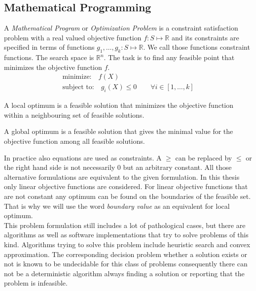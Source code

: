 \subsection{Mathematical Programming}
A \emph{Mathematical Program} or \emph{Optimization Problem} is a constraint satisfaction problem with a real valued objective function $f:S\mapsto \mathbb{R}$ and its constraints are specified in terms of functions $g_1,\dots,g_k:S\mapsto\mathbb{R}$. We call those functions constraint functions. The search space is $\mathbb{R}^n$. The task is to find any feasible point that minimizes the objective function $f$.
\begin{eqnarray}
\text{minimize:} \quad f(X)\\
\text{subject to:} \quad g_i(X)\leq 0 \qquad \forall i\in\left[1,\dots ,k\right] 
\end{eqnarray}
\begin{definition}
A local optimum is a feasible solution that minimizes the objective function within a neighbouring set of feasible solutions.
\end{definition}
\begin{definition}
A global optimum is a feasible solution that gives the minimal value for the objective function among all feasible solutions.
\end{definition}
In practice also equations are used as constraints. A $\geq$ can be replaced by $\leq$ or the right hand side is not necessarily $0$ but an arbitrary constant. All those alternative formulations are equivalent to the given formulation.
In this thesis only linear objective functions are considered. For linear objective functions that are not constant any optimum can be found on the boundaries of the feasible set. That is why we will use the word \emph{boundary value} as an equivalent for local optimum.\\
This problem formulation still includes a lot of pathological cases, but there are algorithms as well as software implementations that try to solve problems of this kind. Algorithms trying to solve this problem include heuristic search and convex approximation. The corresponding decision problem whether a solution exists or not is known to be undecidable for this class of problems consequently there can not be a deterministic algorithm always finding a solution or reporting that the problem is infeasible.
